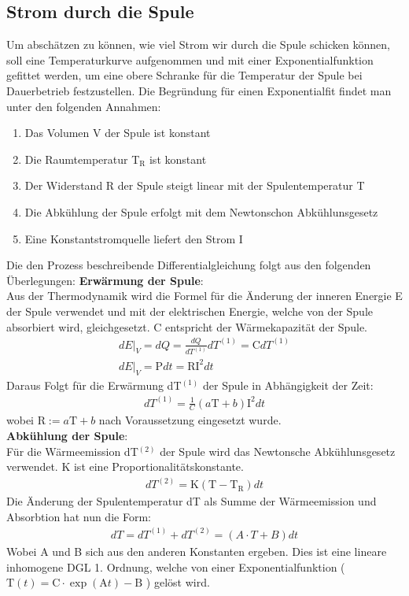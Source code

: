 \documentclass[12pt,a4paper]{article}
\begin{document}
\subsection{Strom durch die Spule}
Um abschätzen zu können, wie viel Strom wir durch die Spule schicken können, soll eine Temperaturkurve aufgenommen und mit einer Exponentialfunktion gefittet werden, um eine obere Schranke für die Temperatur der Spule bei Dauerbetrieb festzustellen. Die Begründung für einen Exponentialfit findet man unter den folgenden Annahmen:
\begin{enumerate}
\item Das Volumen V der Spule ist konstant
\item Die Raumtemperatur T$_\text{R}$ ist konstant
\item Der Widerstand R der Spule steigt linear mit der Spulentemperatur T
\item Die Abkühlung der Spule erfolgt mit dem Newtonschon Abkühlunsgesetz
\item Eine Konstantstromquelle liefert den Strom I
\end{enumerate}
Die den Prozess beschreibende Differentialgleichung folgt aus den folgenden Überlegungen:
\textbf{Erwärmung der Spule}:\\
Aus der Thermodynamik wird die Formel für die Änderung der inneren Energie E der Spule verwendet und mit der elektrischen Energie, welche von der Spule absorbiert wird, gleichgesetzt. C entspricht der Wärmekapazität der Spule.
\begin{align}
dE|_V = dQ = \frac{dQ}{dT^{(1)}}dT^{(1)} = \text{C}dT^{(1)}\\
dE|_V = \text{P}dt = \text{R}\text{I}^2dt
\end{align}
Daraus Folgt für die Erwärmung dT$^{(1)}$ der Spule in Abhängigkeit der Zeit:
\begin{align}
dT^{(1)} = \frac{1}{C}(a\text{T}+b)\text{I}^2 dt
\end{align}
wobei $\text{R}:= a\text{T}+b$ nach Voraussetzung eingesetzt wurde.\\
\textbf{Abkühlung der Spule}:\\
Für die Wärmeemission dT$^{(2)}$ der Spule wird das Newtonsche Abkühlunsgesetz verwendet. K ist eine Proportionalitätskonstante.
\begin{align}
dT^{(2)} = \text{K}(\text{T}-\text{T}_{\text{R}})dt
\end{align}
Die Änderung der Spulentemperatur dT als Summe der Wärmeemission und Absorbtion  hat nun die Form:
\begin{align}
dT = dT^{(1)}+dT^{(2)} = (A\cdot T+B)dt
\end{align}
Wobei A und B sich aus den anderen Konstanten ergeben.
Dies ist eine lineare inhomogene DGL 1. Ordnung, welche von einer Exponentialfunktion ( $\text{T}(t)=\text{C}\cdot \exp(\text{A}t)-\text{B}$ ) gelöst wird.
\end{document}
